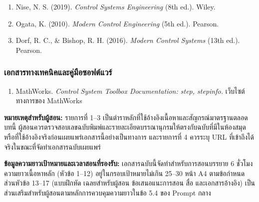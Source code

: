 \begin{enumerate}
    \item Nise, N. S. (2019). \textit{Control Systems Engineering} (8th ed.). Wiley.
    \item Ogata, K. (2010). \textit{Modern Control Engineering} (5th ed.). Pearson.
    \item Dorf, R. C., \& Bishop, R. H. (2016). \textit{Modern Control Systems} (13th ed.). Pearson.
\end{enumerate}

\subsubsection{เอกสารทางเทคนิคและคู่มือซอฟต์แวร์}

\begin{enumerate}
    \item MathWorks. \textit{Control System Toolbox Documentation: step, stepinfo.} เว็บไซต์ทางการของ MathWorks
\end{enumerate}

\textbf{หมายเหตุสำหรับผู้สอน:} รายการที่ 1–3 เป็นตำราหลักที่ใช้อ้างอิงเนื้อหาและสัญกรณ์มาตรฐานตลอดบทนี้ ผู้สอนควรตรวจสอบเลขฉบับพิมพ์และรายละเอียดบรรณานุกรมให้ตรงกับฉบับที่มีในห้องสมุดหรือที่ใช้อ้างอิงจริงก่อนเผยแพร่เอกสารนี้อย่างเป็นทางการ และรายการที่ 4 ควรระบุ URL ที่เข้าถึงได้จริงในขณะที่จัดทำเอกสารฉบับเผยแพร่



\textbf{ข้อมูลความยาวเป้าหมายและเวลาสอนที่รองรับ:} เอกสารฉบับนี้จัดทำสำหรับการสอนบรรยาย 6 ชั่วโมง ความยาวเนื้อหาหลัก (หัวข้อ 1–12) อยู่ในกรอบเป้าหมายไม่เกิน 25–30 หน้า A4 ตามข้อกำหนด ส่วนหัวข้อ 13–17 (แบบฝึกหัด เฉลยสำหรับผู้สอน ข้อเสนอแนะการสอน สื่อ และเอกสารอ้างอิง) เป็นส่วนเสริมสำหรับผู้สอนตามหลักการควบคุมความยาวในข้อ 5.4 ของ Prompt กลาง
